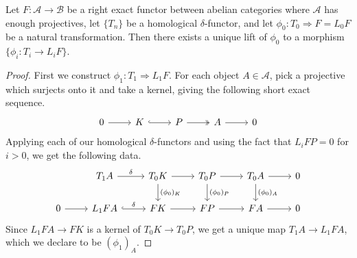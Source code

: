 \documentclass[main.tex]{subfiles}
\begin{document}
\begin{proposition}
  Let $F\colon \mathcal{A} \to \mathcal{B}$ be a right exact functor between abelian categories where $\mathcal{A}$ has enough projectives, let $\{T_{n}\}$ be a homological $\delta$-functor, and let $\phi_{0}\colon T_{0} \Rightarrow F = L_{0}F$ be a natural transformation. Then there exists a unique lift of $\phi_{0}$ to a morphism $\{\phi_{i}\colon T_{i} \to L_{i}F\}$.
\end{proposition}
\begin{proof}
  First we construct $\phi_{1}\colon T_{1} \Rightarrow L_{1}F$. For each object $A \in \mathcal{A}$, pick a projective which surjects onto it and take a kernel, giving the following short exact sequence.
  \begin{equation*}
    \begin{tikzcd}
      0
      \arrow[r]
      & K
      \arrow[r, hook]
      & P
      \arrow[r, two heads]
      & A
      \arrow[r]
      & 0
    \end{tikzcd}
  \end{equation*}
  Applying each of our homological $\delta$-functors and using the fact that $L_{i}FP = 0$ for $i > 0$, we get the following data.
  \begin{equation*}
    \begin{tikzcd}
      & T_{1}A
      \arrow[r, "\delta"]
      & T_{0}K
      \arrow[r]
      \arrow[d, "(\phi_{0})_{K}"]
      & T_{0}P
      \arrow[r]
      \arrow[d, "(\phi_{0})_{P}"]
      & T_{0}A
      \arrow[r]
      \arrow[d, "(\phi_{0})_{A}"]
      & 0
      \\
      0
      \arrow[r]
      & L_{1}FA
      \arrow[r, hook, "\delta"]
      & FK
      \arrow[r]
      & FP
      \arrow[r]
      & FA
      \arrow[r]
      & 0
    \end{tikzcd}
  \end{equation*}
  Since $L_{1}FA \to FK$ is a kernel of $T_{0}K \to T_{0}P$, we get a unique map $T_{1}A \to L_{1}FA$, which we declare to be $(\phi_{1})_{A}$.


\end{proof}
\end{document}
